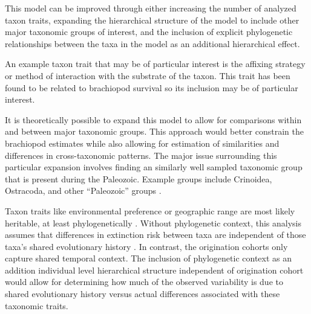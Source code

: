 \documentclass[12pt,letterpaper]{article}
\begin{document}

This model can be improved through either increasing the number of analyzed taxon traits, expanding the hierarchical structure of the model to include other major taxonomic groups of interest, and the inclusion of explicit phylogenetic relationships between the taxa in the model as an additional hierarchical effect.

An example taxon trait that may be of particular interest is the affixing strategy or method of interaction with the substrate of the taxon. This trait has been found to be related to brachiopod survival \citep{Alexander1977} so its inclusion may be of particular interest.

It is theoretically possible to expand this model to allow for comparisons within and between major taxonomic groups. This approach would better constrain the brachiopod estimates while also allowing for estimation of similarities and differences in cross-taxonomic patterns. The major issue surrounding this particular expansion involves finding an similarly well sampled taxonomic group that is present during the Paleozoic. Example groups include Crinoidea, Ostracoda, and other ``Paleozoic'' groups \citep{SepkoskiJr.1981a}.

Taxon traits like environmental preference or geographic range \citep{Jablonski1987,Hunt2005b} are most likely heritable, at least phylogenetically \citep{Lynch1991,Housworth2004}. Without phylogenetic context, this analysis assumes that differences in extinction risk between taxa are independent of those taxa's shared evolutionary history \citep{Felsenstein1985b}. In contrast, the origination cohorts only capture shared temporal context. The inclusion of phylogenetic context as an addition individual level hierarchical structure independent of origination cohort would allow for determining how much of the observed variability is due to shared evolutionary history versus actual differences associated with these taxonomic traits. 
\end{document}

